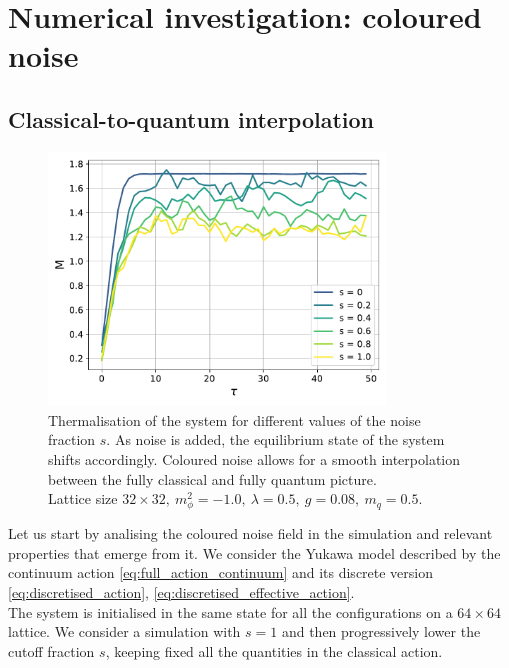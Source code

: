 \chapter{Numerical investigation: coloured noise}
\label{chapt:results_coloured}

\section{Classical-to-quantum interpolation}
\label{sec:classical_to_quantum}
\begin{figure}[h]
    \centering
    \includegraphics[width=0.8\textwidth]{figures/slide_broken/thermalisation.pdf}
    \caption[Thermalisation of the system for different values of the noise fraction $s$.]{Thermalisation of the system for different values of the noise fraction $s$. As noise is added, the equilibrium state of the system shifts accordingly. Coloured noise allows for a smooth interpolation between the fully classical and fully quantum picture.\\ Lattice size $32 \times 32, \ m_\phi^2=-1.0, \ \lambda=0.5, \ g=0.08, \ m_q = 0.5$.}
    \label{fig:thermalisation_different_noise_fracs}
\end{figure}
Let us start by analising the coloured noise field in the simulation and relevant properties that emerge from it. We consider the Yukawa model described by the continuum action \eqref{eq:full_action_continuum} and its discrete version \eqref{eq:discretised_action}, \eqref{eq:discretised_effective_action}.\\
The system is initialised in the same state for all the configurations on a $64 \times 64$ lattice. We consider a simulation with $s=1$ and then progressively lower the cutoff fraction $s$, keeping fixed all the quantities in the classical action. \\
